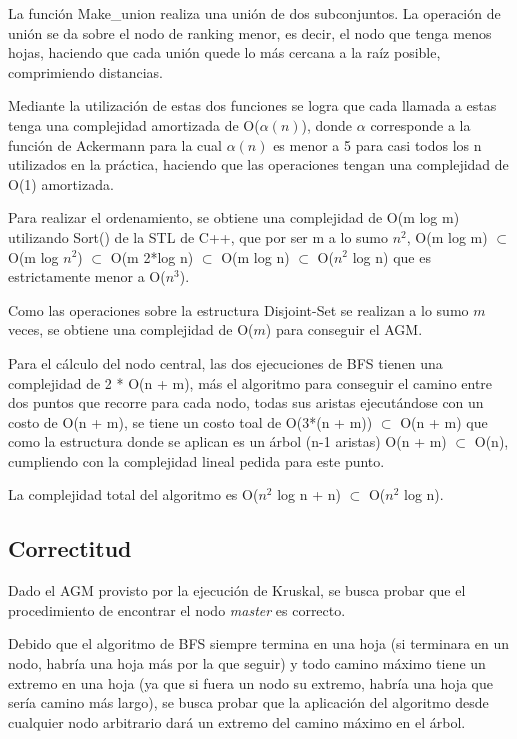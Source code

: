 \documentclass[a4paper, 10pt, twoside]{article}
\begin{document}
La función Make\_union realiza una unión de dos subconjuntos. La operación de unión se da sobre el nodo de ranking menor, es decir, el nodo que tenga menos hojas, haciendo que cada unión quede lo más cercana a la raíz posible, comprimiendo distancias.

Mediante la utilización de estas dos funciones se logra que cada llamada a estas tenga una complejidad amortizada de O($\alpha(n)$), donde $\alpha$ corresponde a la función de Ackermann para la cual $\alpha(n)$ es menor a 5 para casi todos los n utilizados en la práctica, haciendo que las operaciones tengan una complejidad de O(1) amortizada.

Para realizar el ordenamiento, se obtiene una complejidad de O(m log m) utilizando Sort() de la STL de C++, que por ser m a lo sumo $n^2$, O(m log m) $\subset$ O(m log $n^2$) $\subset$ O(m 2*log n) $\subset$ O(m log n) $\subset$ O($n^2$ log n) que es estrictamente menor a O($n^3$).

Como las operaciones sobre la estructura Disjoint-Set se realizan a lo sumo $m$ veces, se obtiene una complejidad de O($m$) para conseguir el AGM.

Para el cálculo del nodo central, las dos ejecuciones de BFS tienen una complejidad de 2 * O(n + m), más el algoritmo para conseguir el camino entre dos puntos que recorre para cada nodo, todas sus aristas ejecutándose con un costo de O(n + m), se tiene un costo toal de O(3*(n + m)) $\subset$ O(n + m) que como la estructura donde se aplican es un árbol (n-1 aristas) O(n + m) $\subset$ O(n), cumpliendo con la complejidad lineal pedida para este punto.

La complejidad total del algoritmo es O($n^2$ log n + n) $\subset$ O($n^2$ log n).

\subsection{Correctitud}

Dado el AGM provisto por la ejecución de Kruskal, se busca probar que el procedimiento de encontrar el nodo \textit{master} es correcto.

Debido que el algoritmo de BFS siempre termina en una hoja (si terminara en un nodo, habría una hoja más por la que seguir) y todo camino máximo tiene un extremo en una hoja (ya que si fuera un nodo su extremo, habría una hoja que sería camino más largo), se busca probar que la aplicación del algoritmo desde cualquier nodo arbitrario dará un extremo del camino máximo en el árbol.
\end{document}
